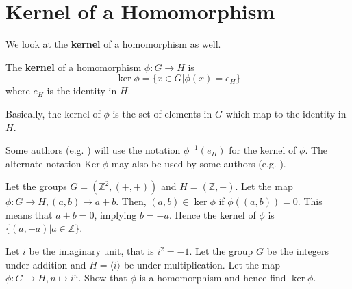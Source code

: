 \section{Kernel of a Homomorphism}
We look at the \textbf{kernel} of a homomorphism as well.

\begin{definition}
    The \textbf{kernel} of a homomorphism $\phi: G \to H$ is
    \[
        \ker\phi = \{x \in G \vert \phi(x) = e_H\}
    \]
    where $e_H$ is the identity in $H$.
\end{definition}
Basically, the kernel of $\phi$ is the set of elements in $G$ which map to the identity in $H$.

\begin{remark}
    Some authors (e.g. \cite{libretexts_imandker}) will use the notation $\phi^{-1}(e_H)$ for the kernel of $\phi$. The alternate notation $\mathrm{Ker}\;\phi$ may also be used by some authors (e.g. \cite{clark_1984, hungerford_1980}).
\end{remark}

\newpage

\begin{example}
    Let the groups $G = (\mathbb{Z}^2, (+, +))$ and $H = (\mathbb{Z}, +)$. Let the map $\phi: G \to H, (a, b) \mapsto a+b$. Then, $(a, b) \in \ker\phi$ if $\phi((a,b)) = 0$. This means that $a+b = 0$, implying $ b = -a$. Hence the kernel of $\phi$ is $\{(a, -a) \vert a \in \mathbb{Z}\}$.
\end{example}

\begin{exercise}
    Let $i$ be the imaginary unit, that is $i^2 = -1$. Let the group $G$ be the integers under addition and $H = \langle i \rangle$ be under multiplication. Let the map $\phi: G \to H, n \mapsto i^n$.  Show that $\phi$ is a homomorphism and hence find $\ker\phi$.
\end{exercise}


